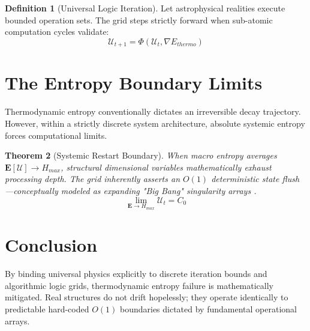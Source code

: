 \documentclass[12pt, a4paper]{article}
\theoremstyle{plain}
\newtheorem{theorem}{Theorem}[section]
\theoremstyle{definition}
\newtheorem{definition}[theorem]{Definition}
\begin{document}
\begin{definition}[Universal Logic Iteration]
Let astrophysical realities execute bounded operation sets. The grid steps strictly forward when sub-atomic computation cycles validate:
\begin{equation}
    \mathcal{U}_{t+1} = \Phi\left(\mathcal{U}_{t}, \nabla E_{thermo}\right)
\end{equation}
\end{definition}

\section{The Entropy Boundary Limits}
Thermodynamic entropy conventionally dictates an irreversible decay trajectory. However, within a strictly discrete system architecture, absolute systemic entropy forces computational limits. 

\begin{theorem} [Systemic Restart Boundary]
When macro entropy averages $\mathbf{E}[\mathcal{U}] \to H_{max}$, structural dimensional variables mathematically exhaust processing depth. The grid inherently asserts an $O(1)$ deterministic state flush—conceptually modeled as expanding "Big Bang" singularity arrays \cite{lamport1978time}.
\begin{equation}
    \lim_{\mathbf{E} \to H_{max}} \mathcal{U}_t = C_0
\end{equation}
\end{theorem}

\section{Conclusion}
By binding universal physics explicitly to discrete iteration bounds and algorithmic logic grids, thermodynamic entropy failure is mathematically mitigated. Real structures do not drift hopelessly; they operate identically to predictable hard-coded $O(1)$ boundaries dictated by fundamental operational arrays.




\vspace{3em}
\noindent\hrulefill
\end{document}
